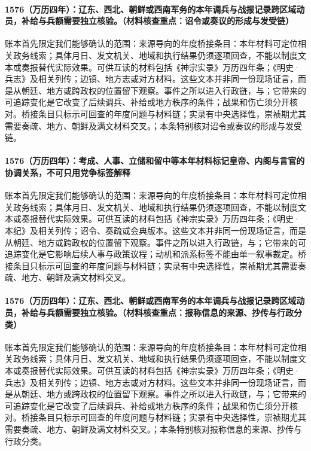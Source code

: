 \paragraph{1576（万历四年）：辽东、西北、朝鲜或西南军务的本年调兵与战报记录跨区域动员，补给与兵额需要独立核验。（材料核查重点：诏令或奏议的形成与发受链）} 账本首先限定我们能够确认的范围：来源导向的年度桥接条目：本年材料可定位相关政务线索；具体月日、发文机关、地域和执行结果仍须逐项回查，不能以制度文本或奏报替代实际效果。可供互读的材料包括《神宗实录》万历四年条；《明史·兵志》及相关列传；边镇、地方志或对方材料。这些文本并非同一份现场证言，而是从朝廷、地方或跨政权的位置留下观察。事件之所以进入行政链，与；它带来的可追踪变化是它改变了后续调兵、补给或地方秩序的条件；战果和伤亡须分开核对。桥接条目只标示可回查的年度问题与材料链；实录有中央选择性，崇祯期尤其需要奏疏、地方、朝鲜及满文材料交叉。；本条特别核对诏令或奏议的形成与发受链。

\paragraph{1576（万历四年）：考成、人事、立储和留中等本年材料标记皇帝、内阁与言官的协调关系，不可只用党争标签解释} 账本首先限定我们能够确认的范围：来源导向的年度桥接条目：本年材料可定位相关政务线索；具体月日、发文机关、地域和执行结果仍须逐项回查，不能以制度文本或奏报替代实际效果。可供互读的材料包括《神宗实录》万历四年条；《明史·本纪》及相关列传；诏令、奏疏或会典版本。这些文本并非同一份现场证言，而是从朝廷、地方或跨政权的位置留下观察。事件之所以进入行政链，与；它带来的可追踪变化是它影响后续人事与政策议程；动机和派系标签不能由单一叙事裁定。桥接条目只标示可回查的年度问题与材料链；实录有中央选择性，崇祯期尤其需要奏疏、地方、朝鲜及满文材料交叉。

\paragraph{1576（万历四年）：辽东、西北、朝鲜或西南军务的本年调兵与战报记录跨区域动员，补给与兵额需要独立核验。（材料核查重点：报称信息的来源、抄传与行政分类）} 账本首先限定我们能够确认的范围：来源导向的年度桥接条目：本年材料可定位相关政务线索；具体月日、发文机关、地域和执行结果仍须逐项回查，不能以制度文本或奏报替代实际效果。可供互读的材料包括《神宗实录》万历四年条；《明史·兵志》及相关列传；边镇、地方志或对方材料。这些文本并非同一份现场证言，而是从朝廷、地方或跨政权的位置留下观察。事件之所以进入行政链，与；它带来的可追踪变化是它改变了后续调兵、补给或地方秩序的条件；战果和伤亡须分开核对。桥接条目只标示可回查的年度问题与材料链；实录有中央选择性，崇祯期尤其需要奏疏、地方、朝鲜及满文材料交叉。；本条特别核对报称信息的来源、抄传与行政分类。

